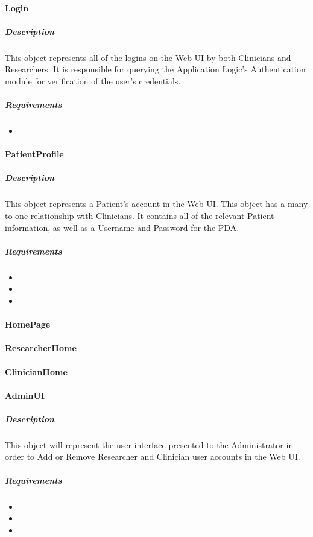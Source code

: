 \documentclass{article}
\begin{document}
\paragraph{Login}
\subparagraph{Description}
This object represents all of the logins on the Web UI by both Clinicians and Researchers. It is responsible for querying the Application Logic's Authentication module for verification of the user's credentials. 
\subparagraph{Requirements}
\begin{itemize}
\item {}
\end{itemize}

\paragraph{PatientProfile}
\subparagraph{Description}
This object represents a Patient's account in the Web UI. This object has a many to one relationship with Clinicians. It contains all of the relevant Patient information, as well as a Username and Password for the PDA.
\subparagraph{Requirements}
\begin{itemize}
\item {}
\item {}
\item {}
\end{itemize}

\paragraph{HomePage}
\paragraph{ResearcherHome}
\paragraph{ClinicianHome}
\paragraph{AdminUI}
\subparagraph{Description}
This object will represent the user interface presented to the Administrator in order to Add or Remove Researcher and Clinician user accounts in the Web UI.
\subparagraph{Requirements}
\begin{itemize}
\item {}
\item {}
\item {}
\end{itemize}
\end{document}
